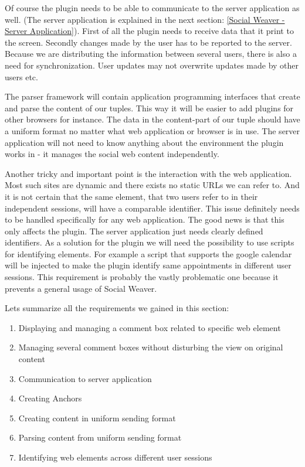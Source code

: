 Of course the plugin needs to be able to communicate to the server application as well. (The server application is explained in the next section: \ref{Social Weaver - Server Application}). First of all the plugin needs to receive data that it print to the screen. Secondly changes made by the user has to be reported to the server. Because we are distributing the information between several users, there is also a need for synchronization. User updates may not overwrite updates made by other users etc.

The parser framework will contain application programming interfaces that create and parse the content of our tuples. This way it will be easier to add plugins for other browsers for instance. 
The data in the content-part of our tuple should have a uniform format no matter what web application or browser is in use. The server application will not need to know anything about the environment the plugin works in - it manages the social web content independently.

Another tricky and important point is the interaction with the web application. Most such sites are dynamic and there exists no static URLs we can refer to. And it is not certain that the same element, that two users refer to in their independent sessions, will have a comparable identifier. This issue definitely needs to be handled specifically for any web application. The good news is that this only affects the plugin. The server application just needs clearly defined identifiers. As a solution for the plugin we will need the possibility to use scripts for identifying elements. For example a script that supports the google calendar will be injected to make the plugin identify same appointments in different user sessions. This requirement is probably the vastly problematic one because it prevents a general usage of Social Weaver.

Lets summarize all the requirements we gained in this section:

\begin{enumerate}
\item Displaying and managing a comment box related to specific web element
\item Managing several comment boxes without disturbing the view on original content
\item Communication to server application
\item Creating Anchors
\item Creating content in uniform sending format
\item Parsing content from uniform sending format
\item Identifying web elements across different user sessions
\end{enumerate}

